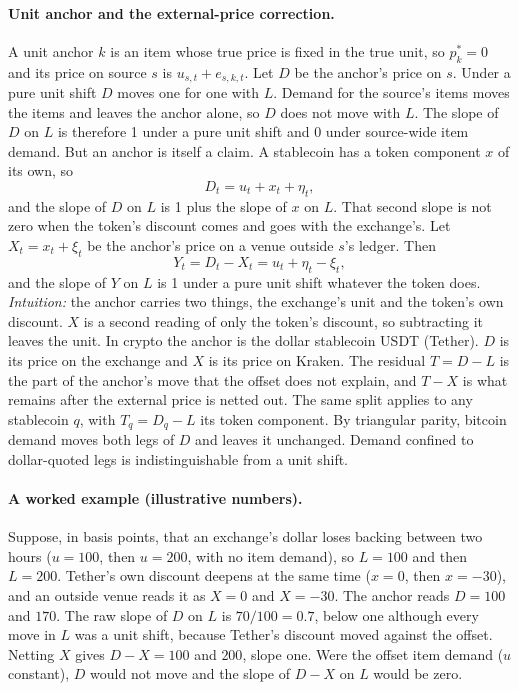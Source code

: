 \documentclass[sigconf,review,anonymous]{acmart}
\begin{document}
\paragraph{Unit anchor and the external-price correction.} A unit anchor $k$ is an item whose true price is fixed in the
true unit, so $p^*_k=0$ and its price on source $s$ is $u_{s,t}+e_{s,k,t}$. Let $D$ be the anchor's price on $s$. Under a
pure unit shift $D$ moves one for one with $L$. Demand for the source's items moves the items and leaves the anchor alone,
so $D$ does not move with $L$. The slope of $D$ on $L$ is therefore 1 under a pure unit shift and 0 under source-wide item
demand. But an anchor is itself a claim. A stablecoin has a token component $x$ of its own, so
\begin{equation}
D_t = u_t + x_t + \eta_t,
\label{eq:anchor}
\end{equation}
and the slope of $D$ on $L$ is 1 plus the slope of $x$ on $L$. That second slope is not zero when the token's discount comes
and goes with the exchange's. Let $X_t=x_t+\xi_t$ be the anchor's price on a venue outside $s$'s ledger. Then
\begin{equation}
Y_t = D_t - X_t = u_t + \eta_t - \xi_t,
\label{eq:netted}
\end{equation}
and the slope of $Y$ on $L$ is 1 under a pure unit shift whatever the token does. \emph{Intuition:} the anchor carries two
things, the exchange's unit and the token's own discount. $X$ is a second reading of only the token's discount, so
subtracting it leaves the unit. In crypto the anchor is the dollar stablecoin USDT (Tether). $D$ is its price on the
exchange and $X$ is its price on Kraken. The residual $T=D-L$ is the part of the anchor's move that the offset does not
explain, and $T-X$ is what remains after the external price is netted out. The same split applies to any stablecoin $q$,
with $T_q=D_q-L$ its token component. By triangular parity, bitcoin demand moves both legs of $D$ and leaves it
unchanged. Demand confined to dollar-quoted legs is indistinguishable from a unit shift.

\paragraph{A worked example (illustrative numbers).} Suppose, in basis points, that an exchange's dollar
loses backing between two hours ($u=100$, then $u=200$, with no item demand), so $L=100$ and then $L=200$. Tether's own discount deepens at the same time
($x=0$, then $x=-30$), and an outside venue reads it as $X=0$ and $X=-30$. The anchor reads $D=100$ and $170$. The raw slope of $D$ on $L$ is $70/100=0.7$,
below one although every move in $L$ was a unit shift, because Tether's discount moved against the offset. Netting $X$ gives $D-X=100$ and $200$, slope one.
Were the offset item demand ($u$ constant), $D$ would not move and the slope of $D-X$ on $L$ would be zero.
\end{document}
